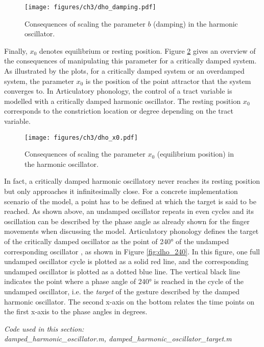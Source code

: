 \begin{figure}
\texttt{[image: figures/ch3/dho\_damping.pdf]}
\caption{Consequences of scaling the parameter $b$ (damping) in the harmonic oscillator.}
\label{fig:dho_damp}
\end{figure}

\hspace*{-1mm}Finally, $x_0$ denotes equilibrium or resting position. Figure \ref{fig:dho_rest} gives an over\-view of the consequences of manipulating this parameter for a critically damped system. As illustrated by the plots, for a critically damped system or an overdamped system, the parameter $x_0$ is the position of the point attractor that the system converges to. In Articulatory phonology, the control of a tract variable is modelled with a critically damped harmonic oscillator. The resting position $x_0$ corresponds to the constriction location or degree depending on the tract variable. 

\begin{figure}
\texttt{[image: figures/ch3/dho\_x0.pdf]}
\caption{Consequences of scaling the parameter $x_0$ (equilibrium position) in the harmonic oscillator.}
\label{fig:dho_rest}
\end{figure}

In fact, a critically damped harmonic oscillatory never reaches its resting position but only approaches it infinitesimally close. For a concrete implementation scenario of the model, a point has to be defined at which the target is said to be reached. As shown above, an undamped oscillator repeats in even cycles and its oscillation can be described by the phase angle as already shown for the finger movements when discussing the \citet{HakenKelsoBunz1985} model. Articulatory phonology defines the target of the critically damped oscillator as the point of 240° of the undamped corresponding oscillator \citep{BrowmanGoldstein1990}, as shown in Figure \ref{fig:dho_240}. In this figure, one full undamped oscillator cycle is plotted as a solid red line, and the corresponding undamped oscillator is plotted as a dotted blue line. The vertical black line indicates the point where a phase angle of 240° is reached in the cycle of the undamped oscillator, i.e. the \emph{target} of the gesture described by the damped harmonic oscillator. The second x-axis on the bottom relates the time points on the first x-axis to the phase angles in degrees.

\medskip\noindent\textit{Code used in this section: \\
damped\_harmonic\_oscillator.m, damped\_harmonic\_oscillator\_target.m}

